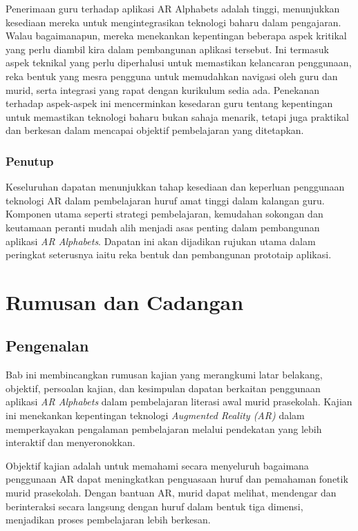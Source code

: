 {{Penerimaan guru terhadap aplikasi AR Alphabets adalah tinggi, menunjukkan kesediaan mereka untuk mengintegrasikan teknologi baharu dalam pengajaran. Walau bagaimanapun, mereka menekankan kepentingan beberapa aspek kritikal yang perlu diambil kira dalam pembangunan aplikasi tersebut. Ini termasuk aspek teknikal yang perlu diperhalusi untuk memastikan kelancaran penggunaan, reka bentuk yang mesra pengguna untuk memudahkan navigasi oleh guru dan murid, serta integrasi yang rapat dengan kurikulum sedia ada. Penekanan terhadap aspek-aspek ini mencerminkan kesedaran guru tentang kepentingan untuk memastikan teknologi baharu bukan sahaja menarik, tetapi juga praktikal dan berkesan dalam mencapai objektif pembelajaran yang ditetapkan.

\subsection{ Penutup }

Keseluruhan dapatan menunjukkan tahap kesediaan dan keperluan penggunaan teknologi AR dalam pembelajaran huruf amat tinggi dalam kalangan guru. Komponen utama seperti strategi pembelajaran, kemudahan sokongan dan keutamaan peranti mudah alih menjadi asas penting dalam pembangunan aplikasi \textit{AR Alphabets}. Dapatan ini akan dijadikan rujukan utama dalam peringkat seterusnya iaitu reka bentuk dan pembangunan prototaip aplikasi.


\chapter{Rumusan dan Cadangan}


\section{{Pengenalan}}
Bab ini membincangkan rumusan kajian yang merangkumi latar belakang, objektif, persoalan kajian, dan kesimpulan dapatan berkaitan penggunaan aplikasi \textit{AR Alphabets} dalam pembelajaran literasi awal murid prasekolah. Kajian ini menekankan kepentingan teknologi \textit{Augmented Reality (AR)} dalam memperkayakan pengalaman pembelajaran melalui pendekatan yang lebih interaktif dan menyeronokkan. 

Objektif kajian adalah untuk memahami secara menyeluruh bagaimana penggunaan AR dapat meningkatkan penguasaan huruf dan pemahaman fonetik murid prasekolah. Dengan bantuan AR, murid dapat melihat, mendengar dan berinteraksi secara langsung dengan huruf dalam bentuk tiga dimensi, menjadikan proses pembelajaran lebih berkesan. 

}}
